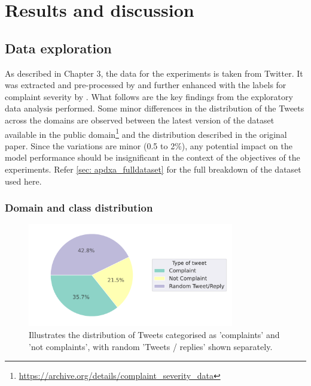 \chapter{Results and discussion}

\section{Data exploration}
As described in Chapter 3, the data for the experiments is taken from Twitter. It was extracted and pre-processed by \cite{preotiuc-pietro_automatically_2019} and further enhanced with the labels for complaint severity by \cite{jinModelingSeverityComplaints2021}. What follows are the key findings from the exploratory data analysis performed. Some minor differences in the distribution of the Tweets across the domains are observed between the latest version of the dataset available in the public domain\footnote{\url{https://archive.org/details/complaint_severity_data}} and the distribution described in the original paper. Since the variations are minor (0.5 to 2\%), any potential impact on the model performance should be insignificant in the context of the objectives of the experiments. Refer \ref{sec: apdxa_fulldataset} for the full breakdown of the dataset used here.

\subsection{Domain and class distribution}
\begin{figure}[htb]
    \centering
    \includegraphics[width=9cm]{figures/compl_non_random_dist.pdf}
    \vspace*{-3mm}
    \caption{Illustrates the distribution of Tweets categorised as 'complaints' and 'not complaints', with random 'Tweets / replies' shown separately.}
    \label{fig: compl_non_random_dist}
\end{figure}


